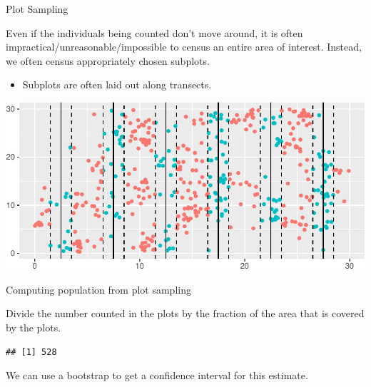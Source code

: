 \documentclass[
  ignorenonframetext,
]{beamer}
\newenvironment{Shaded}{\begin{snugshade}}{\end{snugshade}}
\newcommand{\DecValTok}[1]{\textcolor[rgb]{0.00,0.00,0.81}{#1}}
\newcommand{\KeywordTok}[1]{\textcolor[rgb]{0.13,0.29,0.53}{\textbf{#1}}}
\newcommand{\NormalTok}[1]{#1}
\newcommand{\OperatorTok}[1]{\textcolor[rgb]{0.81,0.36,0.00}{\textbf{#1}}}
\newcommand{\StringTok}[1]{\textcolor[rgb]{0.31,0.60,0.02}{#1}}
\providecommand{\tightlist}{%
  \setlength{\itemsep}{0pt}\setlength{\parskip}{0pt}}
\begin{document}
\begin{frame}{Plot Sampling}
\protect\hypertarget{plot-sampling}{}

Even if the individuals being counted don't move around, it is often
impractical/unreasonable/impossible to census an entire area of
interest. Instead, we often census appropriately chosen subplots.

\begin{itemize}
\tightlist
\item
  Subplots are often laid out along transects.
\end{itemize}

\includegraphics{distance_sampling_files/figure-beamer/unnamed-chunk-7-1.pdf}

\end{frame}

\begin{frame}[fragile]{Computing population from plot sampling}
\protect\hypertarget{computing-population-from-plot-sampling}{}

Divide the number counted in the plots by the fraction of the area that
is covered by the plots.

\scriptsize

\begin{Shaded}
\end{Shaded}

\begin{verbatim}
## [1] 528
\end{verbatim}

\normalsize

We can use a bootstrap to get a confidence interval for this estimate.

\end{frame}
\end{document}

